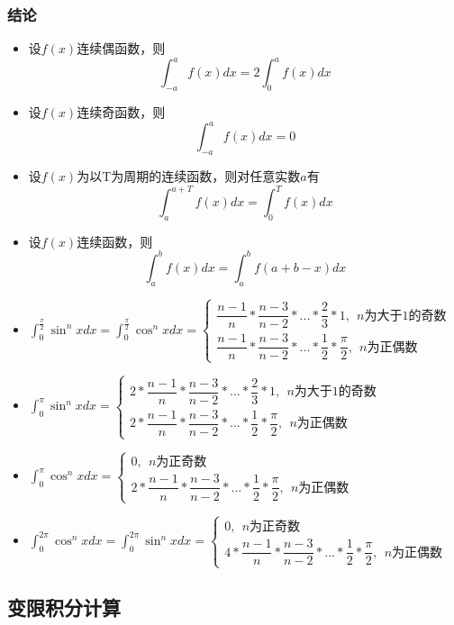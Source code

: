 \subsubsection{结论}
\begin{itemize}
    \item 设\(f(x)\)连续偶函数，则\[\int_{-a}^af(x)dx = 2\int_0^af(x)dx\]
    \item 设\(f(x)\)连续奇函数，则\[\int_{-a}^af(x)dx = 0\]
    \item 设\(f(x)\)为以T为周期的连续函数，则对任意实数\(a\)有\[\int_a^{a + T}f(x)dx = \int_0^Tf(x)dx\]
    \item 设\(f(x)\)连续函数，则\[\int_a^bf(x)dx = \int_a^bf(a + b - x)dx\]
    \item \(\displaystyle\int_0^{\frac{\pi}{2}}\sin^nxdx = \int_0^{\frac{\pi}{2}}\cos^nxdx = \begin{cases}
        \dfrac{n - 1}{n} * \dfrac{n - 3}{n - 2} * ... * \dfrac{2}{3} * 1,\ \ n\text{为大于1的奇数} \\ 
        \dfrac{n - 1}{n} * \dfrac{n - 3}{n - 2} * ... * \dfrac{1}{2} * \dfrac{\pi}{2},\ \ n\text{为正偶数}
    \end{cases}\)
    \item \(\displaystyle\int_0^\pi\sin^nxdx = \begin{cases}
        2 * \dfrac{n - 1}{n} * \dfrac{n - 3}{n - 2} * ... * \dfrac{2}{3} * 1,\ \ n\text{为大于1的奇数} \\ 
        2 * \dfrac{n - 1}{n} * \dfrac{n - 3}{n - 2} * ... * \dfrac{1}{2} * \dfrac{\pi}{2},\ \ n\text{为正偶数}
    \end{cases}\)
    \item \(\displaystyle\int_0^\pi\cos^nxdx = \begin{cases}
        0, \ \ n\text{为正奇数} \\ 
        2 * \dfrac{n - 1}{n} * \dfrac{n - 3}{n - 2} * ... * \dfrac{1}{2} * \dfrac{\pi}{2},\ \ n\text{为正偶数}
    \end{cases}\)
    \item \(\displaystyle\int_0^{2\pi}\cos^nxdx = \int_0^{2\pi}\sin^nxdx = \begin{cases}
        0,\ \  n\text{为正奇数} \\ 
        4 * \dfrac{n - 1}{n} * \dfrac{n - 3}{n - 2} * ... * \dfrac{1}{2} * \dfrac{\pi}{2},\ \ n\text{为正偶数}
    \end{cases}\)
\end{itemize}


\subsection{变限积分计算}
